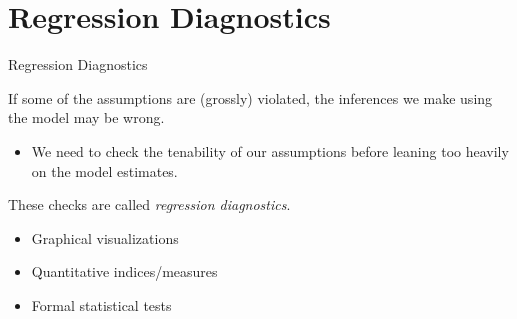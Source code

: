 \documentclass[10pt]{beamer}\usepackage[]{graphicx}\usepackage[]{color}
\begin{document}

\section{Regression Diagnostics}


\begin{frame}{Regression Diagnostics}

  If some of the assumptions are (grossly) violated, the inferences we make
  using the model may be wrong.
  \begin{itemize}
  \item We need to check the tenability of our assumptions before leaning too
    heavily on the model estimates.
  \end{itemize}
  \vb
  These checks are called \emph{regression diagnostics}.
  \begin{itemize}
  \item Graphical visualizations
    \vc
  \item Quantitative indices/measures
    \vc
  \item Formal statistical tests
  \end{itemize}

\end{frame}

\watermarkoff %
\end{document}
